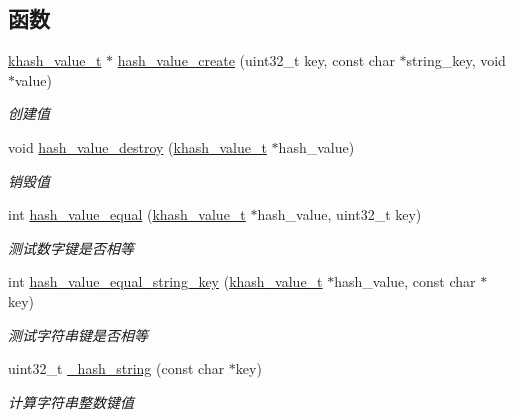 \subsection*{函数}
\begin{DoxyCompactItemize}
\item 
\hyperlink{a00053_aa13ac88a5567525fe44f3670134c3d96_aa13ac88a5567525fe44f3670134c3d96}{khash\+\_\+value\+\_\+t} $\ast$ \hyperlink{a00064_aa5ef4de9803e44078b9bda01aab51065_aa5ef4de9803e44078b9bda01aab51065}{hash\+\_\+value\+\_\+create} (uint32\+\_\+t key, const char $\ast$string\+\_\+key, void $\ast$value)
\begin{DoxyCompactList}\small\item\em 创建值 \end{DoxyCompactList}\item 
void \hyperlink{a00064_a802913eb2b0816f5c3c9d26a991f861d_a802913eb2b0816f5c3c9d26a991f861d}{hash\+\_\+value\+\_\+destroy} (\hyperlink{a00053_aa13ac88a5567525fe44f3670134c3d96_aa13ac88a5567525fe44f3670134c3d96}{khash\+\_\+value\+\_\+t} $\ast$hash\+\_\+value)
\begin{DoxyCompactList}\small\item\em 销毁值 \end{DoxyCompactList}\item 
int \hyperlink{a00064_a0ec14665ff21b19523785b967f48ec10_a0ec14665ff21b19523785b967f48ec10}{hash\+\_\+value\+\_\+equal} (\hyperlink{a00053_aa13ac88a5567525fe44f3670134c3d96_aa13ac88a5567525fe44f3670134c3d96}{khash\+\_\+value\+\_\+t} $\ast$hash\+\_\+value, uint32\+\_\+t key)
\begin{DoxyCompactList}\small\item\em 测试数字键是否相等 \end{DoxyCompactList}\item 
int \hyperlink{a00064_a75b92bdd0e76be083813e5e01ce47aa4_a75b92bdd0e76be083813e5e01ce47aa4}{hash\+\_\+value\+\_\+equal\+\_\+string\+\_\+key} (\hyperlink{a00053_aa13ac88a5567525fe44f3670134c3d96_aa13ac88a5567525fe44f3670134c3d96}{khash\+\_\+value\+\_\+t} $\ast$hash\+\_\+value, const char $\ast$key)
\begin{DoxyCompactList}\small\item\em 测试字符串键是否相等 \end{DoxyCompactList}\item 
uint32\+\_\+t \hyperlink{a00064_abf1a155690ff024f3e8a82878ac4b887_abf1a155690ff024f3e8a82878ac4b887}{\+\_\+hash\+\_\+string} (const char $\ast$key)
\begin{DoxyCompactList}\small\item\em 计算字符串整数键值 \end{DoxyCompactList}\item 

\end{DoxyCompactItemize}

